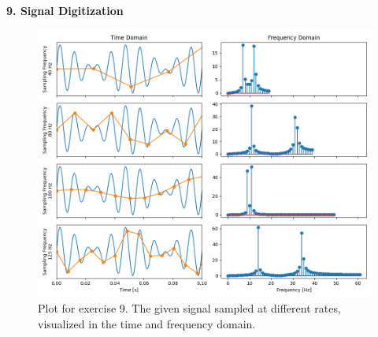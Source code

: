 \textbf{\large 9. Signal Digitization}
\\



\begin{figure}[H]
	\centering
	\includegraphics[width=16cm]{img/ex_9.png}
	\captionsetup{width=14cm}
	\caption{Plot for exercise 9. The given signal sampled at different rates, visualized in the time and frequency domain.}
\end{figure}
